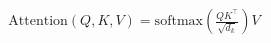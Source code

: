 \documentclass[preview]{standalone}
\begin{document}
\begin{align*}
\mathrm{Attention}(Q, K, V) = \mathrm{softmax}\!\left(\frac{QK^{\top}}{\sqrt{d_k}}\right) V
\end{align*}
\end{document}
